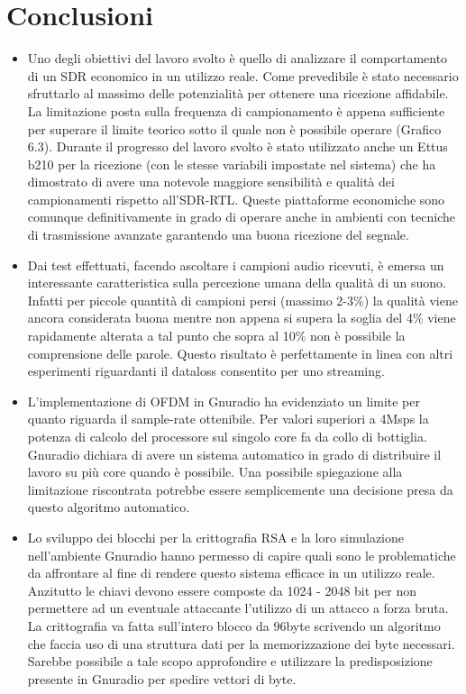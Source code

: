 \chapter{Conclusioni}
\label{cha:conclusioni}
\begin{itemize}
 \item Uno degli obiettivi del lavoro svolto è quello di analizzare il comportamento di un SDR economico in un utilizzo reale. Come prevedibile è stato necessario sfruttarlo al massimo delle potenzialità per ottenere una ricezione affidabile. La limitazione posta sulla frequenza di campionamento è appena sufficiente per superare il limite teorico sotto il quale non è possibile operare (Grafico 6.3). Durante il progresso del lavoro svolto è stato utilizzato anche un Ettus b210 per la ricezione (con le stesse variabili impostate nel sistema) che ha dimostrato di avere una notevole maggiore sensibilità e qualità dei campionamenti rispetto all'SDR-RTL. Queste piattaforme economiche sono comunque definitivamente in grado di operare anche in ambienti con tecniche di trasmissione avanzate garantendo una buona ricezione del segnale.
 \item
 Dai test effettuati, facendo ascoltare i campioni audio ricevuti, è emersa un interessante caratteristica sulla percezione umana della qualità di un suono. Infatti per piccole quantità di campioni persi (massimo 2-3\%) la qualità viene ancora considerata buona mentre non appena si supera la soglia del 4\%  viene rapidamente alterata a tal punto che sopra al 10\% non è possibile la comprensione delle parole.
 Questo risultato è perfettamente in linea con altri esperimenti riguardanti il dataloss consentito per uno streaming. \cite{dataloss}
 \item L'implementazione di OFDM in Gnuradio ha evidenziato un limite per quanto riguarda il sample-rate ottenibile. Per valori superiori a 4Msps la potenza di calcolo del processore sul singolo core fa da collo di bottiglia. Gnuradio dichiara di avere un sistema automatico in grado di distribuire il lavoro su più core quando è possibile. Una possibile spiegazione alla limitazione riscontrata potrebbe essere semplicemente una decisione presa da questo algoritmo automatico.
 \item Lo sviluppo dei blocchi per la crittografia RSA e la loro simulazione nell'ambiente Gnuradio hanno permesso di capire quali sono le problematiche da affrontare al fine di rendere questo sistema efficace in un utilizzo reale. Anzitutto le chiavi devono essere composte da 1024 - 2048 bit per non permettere ad un eventuale attaccante l'utilizzo di un attacco a forza bruta. La crittografia va fatta sull'intero blocco da 96byte scrivendo un algoritmo che faccia uso di una struttura dati per la memorizzazione dei byte necessari. \\Sarebbe possibile a tale scopo approfondire e utilizzare la predisposizione presente in Gnuradio per spedire vettori di byte.

\end{itemize}
